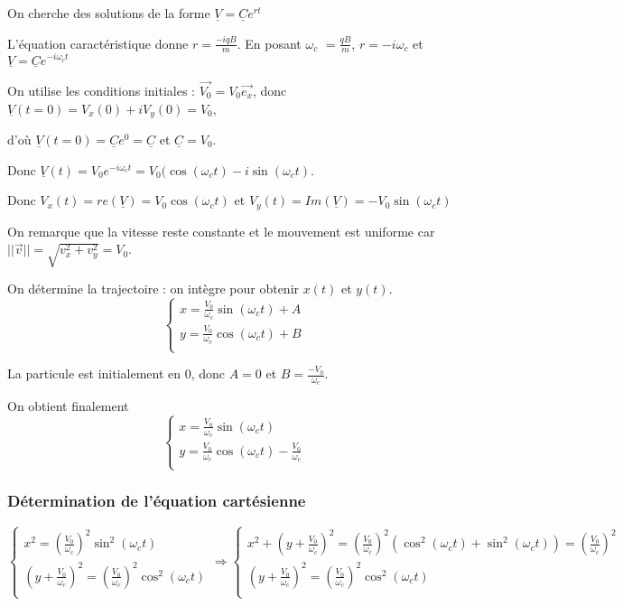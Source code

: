 \documentclass[french]{yLectureNote}
\renewcommand{\vec}{\overrightarrow}
\newcommand{\norm}[1]{||\vec{#1}||}
\begin{document}
On cherche des solutions de la forme $\underline{V} = \underline{C}e^{rt}$

L'équation caractéristique donne $r = \frac{-iqB}{m}$. En posant $\omega_c$ $= \frac{qB}{m}$, $r = -i\omega_c$ et $\underline{V} = \underline{C}e^{-i\omega_ct}$

On utilise les conditions initiales : $\vec{V_0} = V_0\vec{e_x}$, donc $\underline{V}(t=0) = V_x(0) + iV_y(0) = V_0$,

d'où $\underline{V}(t=0) =\underline{C}e^0 = \underline{C}$ et $\underline{C} = V_0$.

Donc $\underline{V}(t) = V_0e^{-i\omega_c t} = V_0(\cos(\omega_c t) - i\sin(\omega_c t)$.

Donc $V_x(t) = re(\underline{V}) = V_0\cos(\omega_c t)$ et $V_y(t) = Im(\underline{V}) = -V_0\sin(\omega_c t)$

On remarque que la vitesse reste constante et le mouvement est uniforme car $\norm{v} = \sqrt{v_x^2+v_y^2} = V_0$.

On détermine la trajectoire : on intègre pour obtenir $x(t)$ et $y(t)$.
\[
 \left\{\begin{matrix}
 x = \frac{V_0}{\omega_c}\sin(\omega_c t) + A \\
 y = \frac{V_0}{\omega_c } \cos(\omega_c t) + B\\
\end{matrix}\right.
\]

La particule est initialement en 0, donc $A=0$ et $B = \frac{-V_0}{\omega_c}$.

On obtient finalement
\[
 \left\{\begin{matrix}
 x = \frac{V_0}{\omega_c}\sin(\omega_c t)  \\
 y = \frac{V_0}{\omega_c } \cos(\omega_c t) -\frac{V_0}{\omega_c }\\
\end{matrix}\right.
\]
\subsubsection{Détermination de l'équation cartésienne}

\[
 \left\{\begin{matrix}
 x^2 = (\frac{V_0}{\omega_c})^2\sin^2(\omega_c t)  \\
 (y+\frac{V_0}{\omega_c })^2 = (\frac{V_0}{\omega_c })^2 \cos^2(\omega_c t)\\
\end{matrix}\right.
\Rightarrow
 \left\{\begin{matrix}
 x^2 + (y+\frac{V_0}{\omega_c })^2 = (\frac{V_0}{\omega_c})^2(\cos^2(\omega_c t)+\sin^2(\omega_c t)) =  (\frac{V_0}{\omega_c})^2\\
 (y+\frac{V_0}{\omega_c })^2 = (\frac{V_0}{\omega_c })^2 \cos^2(\omega_c t)\\
\end{matrix}\right.
\]
\end{document}
